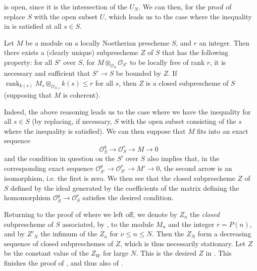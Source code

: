 is open, since it is the intersection of the $U_N$.
We can then, for the proof of  replace $S$ with the open subset $U$, which leads us to the case where the inequality in  is satisfied at all $s\in S$.


\begin{lemma}\label{fga3.iv-3-lemma-3.6}
  Let $M$ be a module on a locally Noetherian prescheme $S$, and $r$ an integer.
  Then there exists a (clearly unique) subprescheme $Z$ of $S$ that has the following property:
  for all $S'$ over $S$, for $M\otimes_{\mathcal{O}_S}\mathcal{O}_{S'}$ to be locally free of rank $r$, it is necessary and sufficient that $S'\to S$ be bounded by $Z$.
  If $\operatorname{rank}_{k(s)}M_s\otimes_{\mathcal{O}_{S,s}} k(s)\leqslant r$ for all $s$, then $Z$ is a closed subprescheme of $S$ (supposing that $M$ is coherent).
\end{lemma}

\begin{cproof}
  Indeed, the above reasoning leads us to the case where we have the inequality  for all $s\in S$ (by replacing, if necessary, $S$ with the open subset consisting of the $s$ where the inequality is satisfied).
  We can then suppose that $M$ fits into an exact sequence
  \[
    \mathcal{O}_S^q \to \mathcal{O}_S^r \to M \to 0
  \]
  and the condition in question on the $S'$ over $S$ also implies that, in the corresponding exact sequence $\mathcal{O}_{S'}^q\to\mathcal{O}_{S'}^r\to M'\to 0$, the second arrow is an isomorphism, i.e. the first is zero.
  We then see that the closed subprescheme $Z$ of $S$ defined by the ideal generated by the coefficients of the matrix defining the homomorphism $\mathcal{O}_S^q\to\mathcal{O}_S^r$ satisfies the desired condition.
\end{cproof}


Returning to the proof of  where we left off, we denote by $Z_n$ the \emph{closed} subprescheme of $S$ associated, by , to the module $M_n$ and the integer $r=P(n)$, and by $Z'_N$ the infimum of the $Z_n$ for $\nu\leqslant n\leqslant N$.
Then the $Z_N$ form a decreasing sequence of closed subpreschemes of $Z$, which is thus necessarily stationary.
Let $Z$ be the constant value of the $Z_W$ for large $N$.
This is the desired $Z$ in .
This finishes the proof of , and thus also of .

